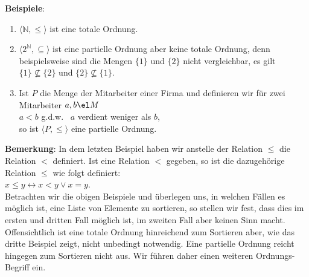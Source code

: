 \noindent
\textbf{Beispiele}:
\begin{enumerate}
\item $\langle\mathbb{N}, \leq \rangle$ ist eine totale Ordnung.
\item $\langle 2^{\mathbb{N}}, \subseteq \rangle$ ist eine partielle Ordnung aber keine totale Ordnung, denn beispielsweise sind die Mengen
      $\{1\}$ und $\{2\}$ nicht vergleichbar, es gilt \\[0.1cm]
      \hspace*{1.3cm} $\{1\} \not\subseteq \{2\}$ und $\{2\} \not\subseteq \{1\}$.
\item Ist $P$ die Menge der Mitarbeiter einer Firma und definieren wir f\"ur zwei
      Mitarbeiter $a,b \el M$\\[0.1cm]
      \hspace*{1.3cm} $a < b$ \quad g.d.w.~ \quad  $a$ verdient weniger als $b$, \\[0.1cm]
      so ist $\langle P, \leq \rangle$ eine partielle Ordnung.
\end{enumerate}
\textbf{Bemerkung}: In dem letzten Beispiel haben wir anstelle der Relation $\leq$ die
Relation $<$ definiert.  Ist eine Relation $<$ gegeben, so ist die dazugeh\"orige Relation
$\leq$ wie folgt definiert: \\[0.1cm]
\hspace*{1.3cm} $x \leq y \leftrightarrow x < y \vee x = y$. \\[0.1cm]
Betrachten wir die obigen Beispiele und \"uberlegen uns, in welchen F\"allen es m\"oglich ist,
eine Liste von Elemente zu sortieren, so stellen wir fest, dass dies im ersten und dritten Fall m\"oglich
ist, im zweiten Fall aber keinen Sinn macht.  Offensichtlich ist eine
totale Ordnung hinreichend zum Sortieren aber, wie das dritte Beispiel zeigt, nicht
unbedingt notwendig.  Eine partielle Ordnung reicht hingegen zum Sortieren nicht aus.
Wir f\"uhren daher einen weiteren Ordnungs-Begriff ein.

